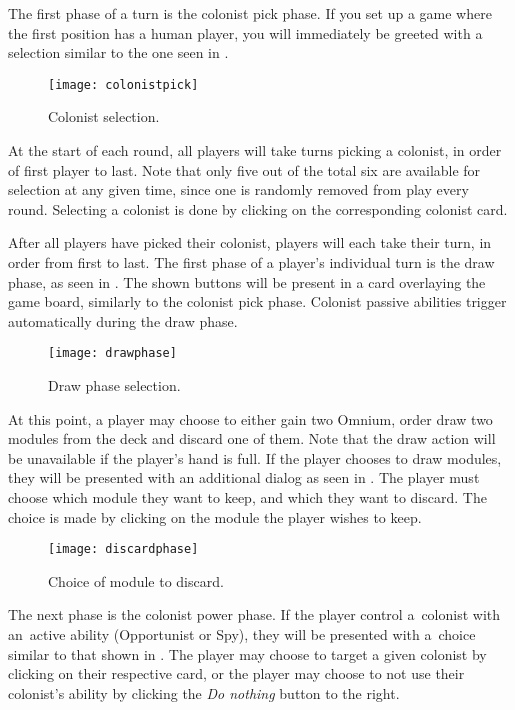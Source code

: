 The first phase of a turn is the colonist pick phase. If you set up a game where
the first position has a human player, you will immediately be greeted with a selection
similar to the one seen in .

\begin{figure}[ht]
\centerline{\mbox{\texttt{[image: colonistpick]}}}
\caption{Colonist selection.}\label{ud:colonistpick}
\end{figure}

At the start of each round, all players will take turns picking a colonist,
in order of first player to last. Note that only five out of the total
six are available for selection at any given time, since one is randomly removed
from play every round. Selecting a colonist is done by clicking on the corresponding
colonist card.

After all players have picked their colonist, players will each take their turn,
in order from first to last. The first phase of a player's individual turn is
the draw phase, as seen in . The shown buttons will be present
in a card overlaying the game board, similarly to the colonist pick phase.
Colonist passive abilities trigger automatically during the draw phase.

\begin{figure}[ht]
\centerline{\mbox{\texttt{[image: drawphase]}}}
\caption{Draw phase selection.}\label{ud:drawphase}
\end{figure}

At this point, a player may choose to either gain two Omnium, order
draw two modules from the deck and discard one of them.
Note that the draw action will be unavailable if the player's hand is full.
If the player chooses to draw modules, they will be presented with an additional
dialog as seen in . The player must choose which module they
want to keep, and which they want to discard. The choice is made by clicking on the
module the player wishes to keep.

\begin{figure}[ht]
\centerline{\mbox{\texttt{[image: discardphase]}}}
\caption{Choice of module to discard.}\label{ud:discardphase}
\end{figure}

The next phase is the colonist power phase. If the player control a~colonist
with an~active ability (Opportunist or Spy), they will be presented with a~choice
similar to that shown in . The player may choose to target
a given colonist by clicking on their respective card, or the player may choose
to not use their colonist's ability by clicking the \emph{Do nothing} button
to the right.

